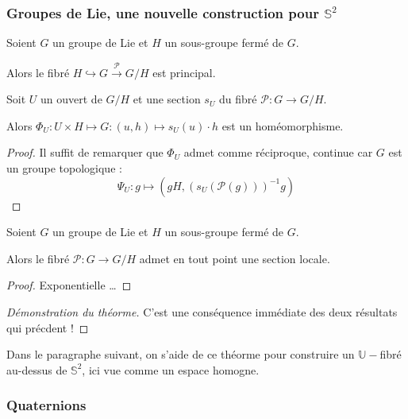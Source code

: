 \subsubsection{Groupes de Lie, une nouvelle construction pour $\mathbb{S}^2$}

\begin{theo}\label{esh}
Soient $G$ un groupe de Lie et $H$ un sous-groupe ferm\'e de $G$.
\par
Alors le fibr\'e $H\hookrightarrow G\xrightarrow{\mathcal{P}}G/H$ est principal.
\end{theo}

\begin{lemm}
Soit $U$ un ouvert de $G/H$ et une section $s_U$ du fibr\'e $\mathcal{P}:G\rightarrow G/H$.
\par
Alors $\Phi_U:U\times H\mapsto G:(u,h)\mapsto s_U(u)\cdot h$ est un hom\'eomorphisme.
\end{lemm}

\begin{proof}
Il suffit de remarquer que $\Phi_U$ admet comme r\'eciproque, continue car $G$ est un groupe topologique :
\[\Psi_U:g\mapsto \left(gH,\left(s_U(\mathcal{P}(g))\right)^{-1}g\right)\]
\end{proof}

\begin{lemm}\label{sfl}
Soient $G$ un groupe de Lie et $H$ un sous-groupe ferm\'e de $G$.
\par
Alors le fibr\'e $\mathcal{P}:G\rightarrow G/H$ admet en tout point une section locale.
\end{lemm}

\begin{proof}
Exponentielle \dots
\end{proof}

\begin{proof}[D\'emonstration du th\'eorme]
C'est une cons\'equence imm\'ediate des deux r\'esultats qui pr\'ecdent !
\end{proof}

\etoile

Dans le paragraphe suivant, on s'aide de ce th\'eorme pour construire un $\mathbb{U}-$fibr\'e au-dessus de $\mathbb{S}^2$, ici vue comme un espace homogne.

\subsubsection{Quaternions}


